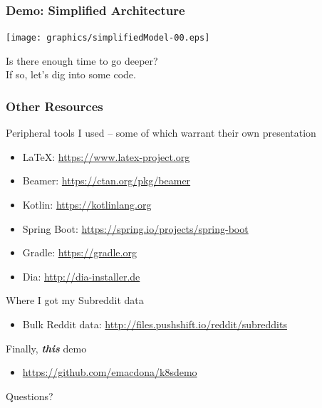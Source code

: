 \documentclass{beamer}
\begin{document}
\begin{frame}
    \frametitle{Demo: Simplified Architecture}
    \texttt{[image: graphics/simplifiedModel-00.eps]}
\end{frame}

\begin{frame}
    \begin{center}
        \Huge Is there enough time to go deeper?\\
        If so, let's dig into some code.
    \end{center}
\end{frame}

\begin{frame}
\frametitle{Other Resources}
Peripheral tools I used -- some of which warrant their own presentation
\begin{itemize}
    \item \LaTeX: \href{https://www.latex-project.org}{https://www.latex-project.org}
    \item Beamer: \href{https://ctan.org/pkg/beamer}{https://ctan.org/pkg/beamer}
    \item Kotlin: \href{https://kotlinlang.org}{https://kotlinlang.org}
    \item Spring Boot: \href{https://spring.io/projects/spring-boot}{https://spring.io/projects/spring-boot}
    \item Gradle: \href{https://gradle.org}{https://gradle.org}
    \item Dia: \href{http://dia-installer.de}{http://dia-installer.de}
\end{itemize}
\smallskip
Where I got my Subreddit data
\begin{itemize}
    \item Bulk Reddit data: \href{http://files.pushshift.io/reddit/subreddits}{http://files.pushshift.io/reddit/subreddits}
\end{itemize}
Finally, \textbf{\textit{this}} demo
\begin{itemize}
    \item \href{https://github.com/emacdona/k8sdemo}{https://github.com/emacdona/k8sdemo}
\end{itemize}
\end{frame}

\begin{frame}
    \begin{center}
        \Huge Questions?
    \end{center}
\end{frame}
\end{document}

